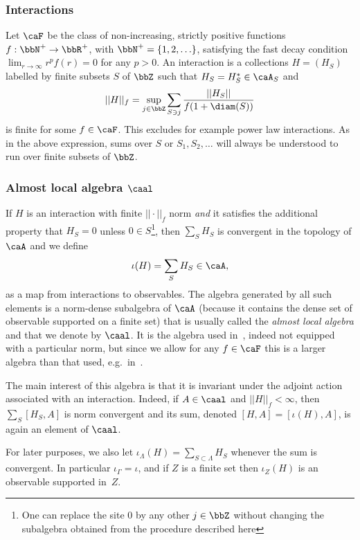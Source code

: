 \subsubsection{Interactions}\label{sec: interactions}
Let $\caF$ be the class of non-increasing, strictly positive functions $f:\bbN^+\to\bbR^+$, with $\bbN^+=\{1,2,\ldots\}$, satisfying the fast decay condition $\lim_{r\to\infty}r^pf(r)=0$ for any $p>0$. 
An interaction is a collections $H=(H_S)$ labelled by finite subsets $S$ of $\bbZ$ such that $H_S=H^*_S \in\caA_S$ and
$$
|| H ||_f  = \sup_{j\in\bbZ}  \sum_{S \ni j} \frac{||H_S||}{f(1+\diam(S))}
$$
is finite for some $f \in\caF$. This excludes for example power law interactions. As in the above expression, sums over $S$ or $S_1,S_2,\ldots$ will always be understood to run over  finite subsets of $\bbZ$.


\subsubsection{Almost local algebra $\caal$}\label{subsec:alal}

If $H$ is an interaction with finite $||\cdot||_f$ norm \emph{and} it satisfies the additional property that $H_S=0$ unless $0 \in S$\footnote{One can replace the site $0$ by any other $j\in\bbZ$ without changing the subalgebra obtained from the procedure described here},  then $\sum_{S} H_S$ is convergent in the topology of $\caA$ and we define
$$
\iota(H)= \sum_{S} H_S\in\caA,
$$
as a map from interactions to observables. The algebra generated by all such elements is a norm-dense subalgebra of $\caA$ (because it contains the dense set of observable supported on a finite set) that is usually called the \emph{almost local algebra} and that we denote by $\caal$. It is the algebra used in~\cite{kapustin2021classification}, indeed not equipped with a particular norm, but since we allow for any $f\in\caF$ this is a larger algebra than that used, e.g.~in~\cite{moon2020automorphic}.

The main interest of this algebra is that it is invariant under the adjoint action associated with an interaction. Indeed, if $A\in\caal$ and $||H||_f <\infty $, then $\sum_{S} [H_S,A]$ is norm convergent and its sum, denoted $[H,A] = [\iota(H),A]$, is again an element of $\caal$.

For later purposes, we also let $\iota_\Lambda(H) = \sum_{S\subset\Lambda} H_S$ whenever the sum is convergent. In particular $\iota_\Gamma = \iota$, and if $Z$ is a finite set then $\iota_Z(H)$ is an observable supported in~$Z$.

